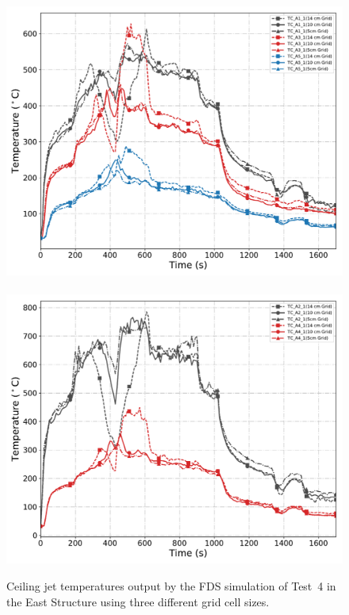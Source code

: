 \begin{figure}[!h]
	\centering
	\includegraphics[width=0.87\columnwidth]{Figures/Plots/Grid_Sensitivity/Temperature/Test_04_cjet_1}
	\\~\\
	\includegraphics[width=0.87\columnwidth]{Figures/Plots/Grid_Sensitivity/Temperature/Test_04_cjet_2}
	\caption[Ceiling jet temperatures for East Structure simulation with different grid cell sizes.]{Ceiling jet temperatures output by the FDS simulation of Test~4 in the East Structure using three different grid cell sizes.}
	\label{fig:east_cjet_sensitivity}
\end{figure}


